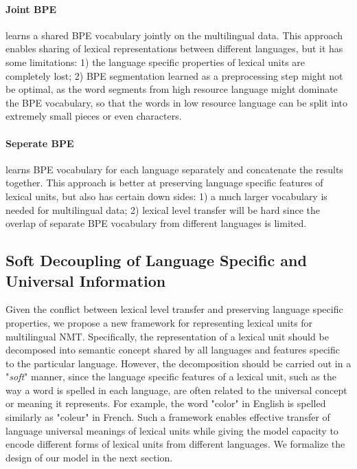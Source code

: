 \paragraph{Joint BPE} learns a shared BPE vocabulary jointly on the multilingual data. This approach enables sharing of lexical representations between different languages, but it has some limitations: 1) the language specific properties of lexical units are completely lost; 2) BPE segmentation learned as a preprocessing step might not be optimal, as the word segments from high resource language might dominate the BPE vocabulary, so that the words in low resource language can be split into extremely small pieces or even characters. 
\paragraph{Seperate BPE} learns BPE vocabulary for each language separately and concatenate the results together. This approach is better at preserving language specific features of lexical units, but also has certain down sides: 1) a much larger vocabulary is needed for multilingual data; 2) lexical level transfer will be hard since the overlap of separate BPE vocabulary from different languages is limited.

\subsection{Soft Decoupling of Language Specific and Universal Information}
Given the conflict between lexical level transfer and preserving language specific properties, we propose a new framework for representing lexical units for multilingual NMT. Specifically, the representation of a lexical unit should be decomposed into semantic concept shared by all languages and features specific to the particular language. However, the decomposition should be carried out in a "\textit{soft}" manner, since the language specific features of a lexical unit, such as the way a word is spelled in each language, are often related to the universal concept or meaning it represents. For example, the word "color" in English is spelled similarly as "coleur" in French. Such a framework enables effective transfer of language universal meanings of lexical units while giving the model capacity to encode different forms of lexical units from different languages. We formalize the design of our model in the next section.  


